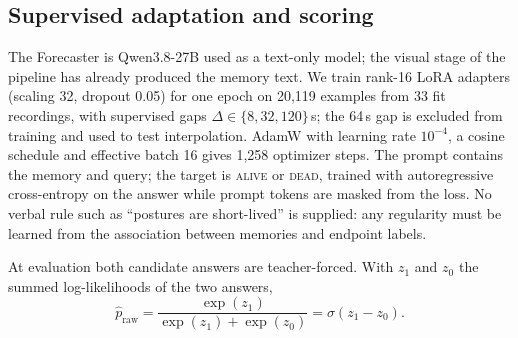 \documentclass[10pt]{article}
\newcommand{\alive}{\textsc{alive}}
\newcommand{\dead}{\textsc{dead}}
\begin{document}
\subsection{Supervised adaptation and scoring}
The Forecaster is Qwen3.8-27B \citep{qwen2026qwen38} used as a text-only model; the visual stage of the pipeline has already produced the memory text. We train rank-16 LoRA adapters (scaling 32, dropout 0.05) for one epoch on 20,119 examples from 33 fit recordings, with supervised gaps $\Delta \in \{8, 32, 120\}$\,s; the 64\,s gap is excluded from training and used to test interpolation. AdamW with learning rate $10^{-4}$, a cosine schedule and effective batch 16 gives 1,258 optimizer steps. The prompt contains the memory and query; the target is \alive{} or \dead{}, trained with autoregressive cross-entropy on the answer while prompt tokens are masked from the loss. No verbal rule such as ``postures are short-lived'' is supplied: any regularity must be learned from the association between memories and endpoint labels.

At evaluation both candidate answers are teacher-forced. With $z_1$ and $z_0$ the summed log-likelihoods of the two answers,
\begin{equation}
\hat p_{\text{raw}} = \frac{\exp(z_1)}{\exp(z_1)+\exp(z_0)} = \sigma(z_1 - z_0).
\label{eq:score}
\end{equation}
\end{document}
